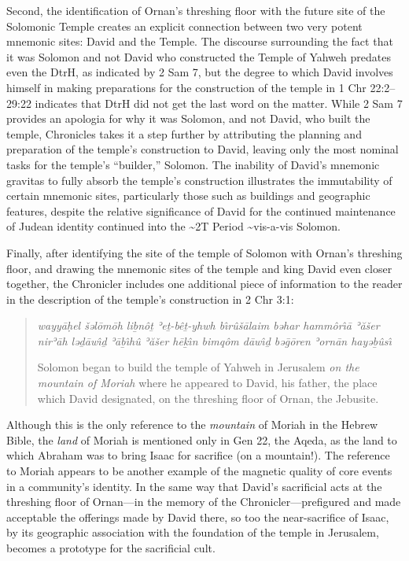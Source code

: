 Second, the identification of Ornan's threshing floor with the future
site of the Solomonic Temple creates an explicit connection between two
very potent mnemonic sites: David and the Temple. The discourse
surrounding the fact that it was Solomon and not David who constructed
the Temple of Yahweh predates even the DtrH, as indicated by 2 Sam 7,
but the degree to which David involves himself in making preparations
for the construction of the temple in 1 Chr 22:2--29:22 indicates that
DtrH did not get the last word on the matter. While 2 Sam 7 provides an
apologia for why it was Solomon, and not David, who built the temple,
Chronicles takes it a step further by attributing the planning and
preparation of the temple's construction to David, leaving only the most
nominal tasks for the temple's ``builder,'' Solomon. The inability of
David's mnemonic gravitas to fully absorb the temple's construction
illustrates the immutability of certain mnemonic sites, particularly
those such as buildings and geographic features, despite the relative
significance of David for the continued maintenance of Judean identity
continued into the \textasciitilde{}2T Period \textasciitilde{}vis-a-vis
Solomon.

Finally, after identifying the site of the temple of Solomon with
Ornan's threshing floor, and drawing the mnemonic sites of the temple
and king David even closer together, the Chronicler includes one
additional piece of information to the reader in the description of the
temple's construction in 2 Chr 3:1:

\begin{quote}
\emph{wayyāḥel šəlōmōh liḇnôṯ ʾeṯ-bêṯ-yhwh bı̂rûšālaim bəhar hammôrı̂ā
ʾăšer nirʾāh ləḏāwı̂ḏ ʾāḇı̂hû ʾăšer hēḵı̂n bimqôm dāwı̂ḏ bəḡōren ʾornān
hayəḇûsı̂}

Solomon began to build the temple of Yahweh in Jerusalem \emph{on the
mountain of Moriah} where he appeared to David, his father, the place
which David designated, on the threshing floor of Ornan, the Jebusite.
\end{quote}

Although this is the only reference to the \emph{mountain} of Moriah in
the Hebrew Bible, the \emph{land} of Moriah is mentioned only in Gen 22,
the Aqeda, as the land to which Abraham was to bring Isaac for sacrifice
(on a mountain!).\autocite[358--359]{kalimi_htr1990} The reference to
Moriah appears to be another example of the magnetic quality of core
events in a community's identity. In the same way that David's
sacrificial acts at the threshing floor of Ornan---in the memory of the
Chronicler---prefigured and made acceptable the offerings made by David
there, so too the near-sacrifice of Isaac, by its geographic association
with the foundation of the temple in Jerusalem, becomes a prototype for
the sacrificial cult.\autocite[In fact, \textasciitilde{}vermes makes
this point explicit and traces the tradition into early Christianity.
See][204--211]{vermes1961}

